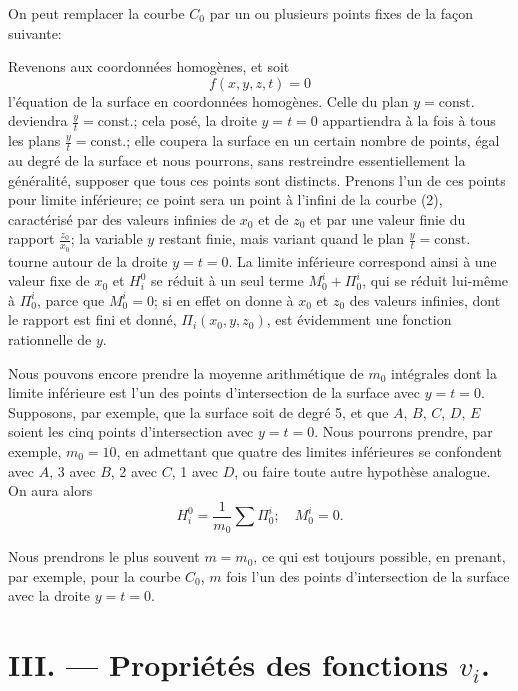 \documentclass{article}
\begin{document}
On peut remplacer la courbe $C_{0}$ par un ou plusieurs points fixes de la façon suivante:

Revenons aux coordonnées homogènes, et soit
\[
f(x, y, z, t) = 0
\]
l'équation de la surface en coordonnées homogènes. Celle du plan $y = \text{const.}$ deviendra $\displaystyle\frac{y}{t} = \text{const.}$; cela posé, la droite $y = t = 0$ appartiendra à la fois à tous les plans $\displaystyle\frac{y}{t} = \text{const.}$; elle coupera la surface en un certain nombre de points, égal au degré de la surface et nous pourrons, sans restreindre essentiellement la généralité, supposer que tous ces points sont distincts. Prenons l'un de ces points pour limite inférieure; ce point sera un point à l'infini de la courbe (2), caractérisé par des valeurs infinies de $x_{0}$ et de $z_{0}$ et par une valeur finie du rapport
$\displaystyle\frac{z_{0}}{x_{0}}$; la variable $y$ restant finie, mais variant quand le plan $\displaystyle\frac{y}{t} = \text{const.}$ tourne autour de la droite $y = t = 0$. La limite inférieure correspond ainsi à une valeur fixe de $x_{0}$ et $H_{i}^{0}$ se réduit à un seul terme $M_{0}^{i} + \Pi_{0}^{i}$, qui se réduit lui-même à $\Pi_{0}^{i}$, parce que $M_{0}^{i} = 0$; si en effet on donne à $x_{0}$ et $z_{0}$ des valeurs infinies, dont le rapport est fini et donné, $\Pi_{i}(x_{0}, y, z_{0})$, est évidemment une fonction rationnelle de $y$.

Nous pouvons encore prendre la moyenne arithmétique de $m_{0}$ intégrales dont la limite inférieure est l'un des points d'intersection de la surface avec $y = t = 0$. Supposons, par exemple, que la surface soit de degré 5, et que $A$, $B$, $C$, $D$, $E$ soient les cinq points d'intersection avec $y = t = 0$. Nous pourrons prendre, par exemple, $m_{0} = 10$, en admettant que quatre des limites inférieures se confondent avec $A$, 3 avec $B$, 2 avec $C$, 1 avec $D$, ou faire toute autre hypothèse analogue. On aura alors
\[
H_{i}^{0} = \frac{1}{m_{0}} \sum \Pi_{0}^{i}; \quad M_{0}^{i} = 0.
\]

Nous prendrons le plus souvent $m = m_{0}$, ce qui est toujours possible, en prenant, par exemple, pour la courbe $C_{0}$, $m$ fois l'un des points d'intersection de la surface avec la droite $y = t = 0$.

\section*{III. --- Propriétés des fonctions $v_i$.}
\end{document}
